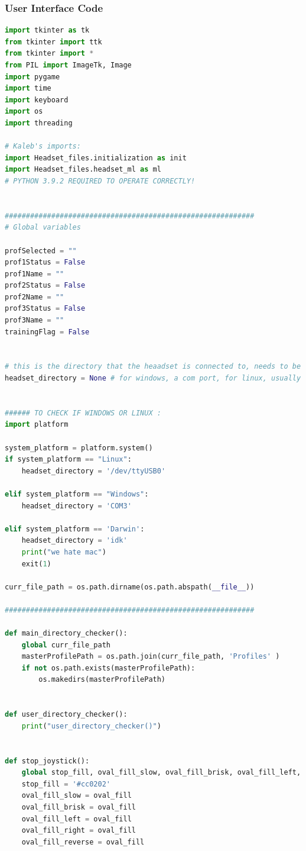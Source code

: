 \documentclass[conference]{IEEEtran}
\begin{document}
    \subsubsection{User Interface Code}
    \begin{lstlisting}[language=Python, caption=GUI CODE, label=gui_code]
import tkinter as tk
from tkinter import ttk
from tkinter import *
from PIL import ImageTk, Image
import pygame
import time
import keyboard
import os
import threading

# Kaleb's imports: 
import Headset_files.initialization as init
import Headset_files.headset_ml as ml
# PYTHON 3.9.2 REQUIRED TO OPERATE CORRECTLY!


###########################################################
# Global variables

profSelected = ""
prof1Status = False
prof1Name = ""
prof2Status = False
prof2Name = ""
prof3Status = False
prof3Name = ""
trainingFlag = False


# this is the directory that the heaadset is connected to, needs to be configured on each run
headset_directory = None # for windows, a com port, for linux, usually '/dev/ttyUSB0'


###### TO CHECK IF WINDOWS OR LINUX :
import platform

system_platform = platform.system()
if system_platform == "Linux":
    headset_directory = '/dev/ttyUSB0'

elif system_platform == "Windows":
    headset_directory = 'COM3'

elif system_platform == 'Darwin':
    headset_directory = 'idk'
    print("we hate mac")
    exit(1)

curr_file_path = os.path.dirname(os.path.abspath(__file__))

###########################################################

def main_directory_checker():
    global curr_file_path
    masterProfilePath = os.path.join(curr_file_path, 'Profiles' )
    if not os.path.exists(masterProfilePath):
        os.makedirs(masterProfilePath)


def user_directory_checker():
    print("user_directory_checker()")


def stop_joystick():
    global stop_fill, oval_fill_slow, oval_fill_brisk, oval_fill_left, oval_fill_right, oval_fill_reverse, oval_fill
    stop_fill = '#cc0202'
    oval_fill_slow = oval_fill
    oval_fill_brisk = oval_fill
    oval_fill_left = oval_fill
    oval_fill_right = oval_fill
    oval_fill_reverse = oval_fill



\end{lstlisting}
\end{document}
